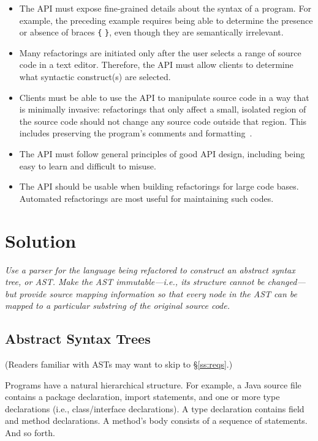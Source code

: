 \documentclass[prodmode]{acmlarge}
\newcommand{\ttt}[1]{\texttt{#1}}
\begin{document}
\begin{itemize}

\item The API must expose fine-grained details about the syntax of a program.
For example, the preceding example requires being able to determine the
presence or absence of braces \ttt{\{} \ttt{\}}, even though they are
semantically irrelevant.

\item Many refactorings are initiated only after the user selects a range of
source code in a text editor.  Therefore, the API must allow clients to
determine what syntactic construct(s) are selected.

\item Clients must be able to use the API to manipulate source code in a way
that is minimally invasive: refactorings that only affect a small, isolated
region of the source code should not change any source code outside that
region.  This includes preserving the program's comments and
formatting~\cite{sommerlad08retaining}.

\item The API must follow general principles of good API design, including
being easy to learn and difficult to misuse.

\item The API should be usable when building refactorings for large code bases.
Automated refactorings are most useful for maintaining such codes.

\end{itemize}

\section{Solution}

\textit{Use a parser for the language being refactored to construct an
\textup{abstract syntax tree}, or \textup{AST}.  Make the AST
\textup{immutable}---i.e., its structure cannot be changed---but provide
\textup{source mapping} information so that every node in the AST can be mapped
to a particular substring of the original source code.}

\subsection{Abstract Syntax Trees}
\label{ss:asts}

(Readers familiar with ASTs may want to skip to \S\ref{ss:reqs}.)

Programs have a natural hierarchical structure.  For example, a Java source
file contains a package declaration, import statements, and one or more type
declarations (i.e., class/interface declarations).  A type declaration contains
field and method declarations.  A method's body consists of a sequence of
statements.  And so forth.
\end{document}
